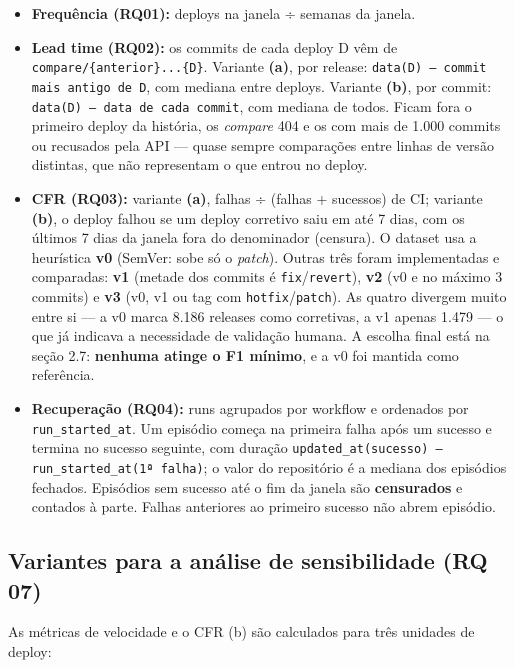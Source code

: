 \documentclass[12pt]{article}
\begin{document}
\begin{itemize}
  \item \textbf{Frequência (RQ01):} deploys na janela ÷ semanas da janela.
  \item \textbf{Lead time (RQ02):} os commits de cada deploy D vêm de \texttt{compare/\{anterior\}...\{D\}}. Variante \textbf{(a)}, por release: \texttt{data(D) -- commit mais antigo de D}, com mediana entre deploys. Variante \textbf{(b)}, por commit: \texttt{data(D) -- data de cada commit}, com mediana de todos. Ficam fora o primeiro deploy da história, os \emph{compare} 404 e os com mais de 1.000 commits ou recusados pela API — quase sempre comparações entre linhas de versão distintas, que não representam o que entrou no deploy.
  \item \textbf{CFR (RQ03):} variante \textbf{(a)}, falhas ÷ (falhas + sucessos) de CI; variante \textbf{(b)}, o deploy falhou se um deploy corretivo saiu em até 7 dias, com os últimos 7 dias da janela fora do denominador (censura). O dataset usa a heurística \textbf{v0} (SemVer: sobe só o \emph{patch}). Outras três foram implementadas e comparadas: \textbf{v1} (metade dos commits é \texttt{fix}/\texttt{revert}), \textbf{v2} (v0 e no máximo 3 commits) e \textbf{v3} (v0, v1 ou tag com \texttt{hotfix}/\texttt{patch}). As quatro divergem muito entre si — a v0 marca 8.186 releases como corretivas, a v1 apenas 1.479 — o que já indicava a necessidade de validação humana. A escolha final está na seção 2.7: \textbf{nenhuma atinge o F1 mínimo}, e a v0 foi mantida como referência.
  \item \textbf{Recuperação (RQ04):} runs agrupados por workflow e ordenados por \texttt{run\_started\_at}. Um episódio começa na primeira falha após um sucesso e termina no sucesso seguinte, com duração \texttt{updated\_at(sucesso) -- run\_started\_at(1ª falha)}; o valor do repositório é a mediana dos episódios fechados. Episódios sem sucesso até o fim da janela são \textbf{censurados} e contados à parte. Falhas anteriores ao primeiro sucesso não abrem episódio.
\end{itemize}

\subsection{Variantes para a análise de sensibilidade (RQ 07)}

As métricas de velocidade e o CFR (b) são calculados para três unidades de deploy:
\end{document}
